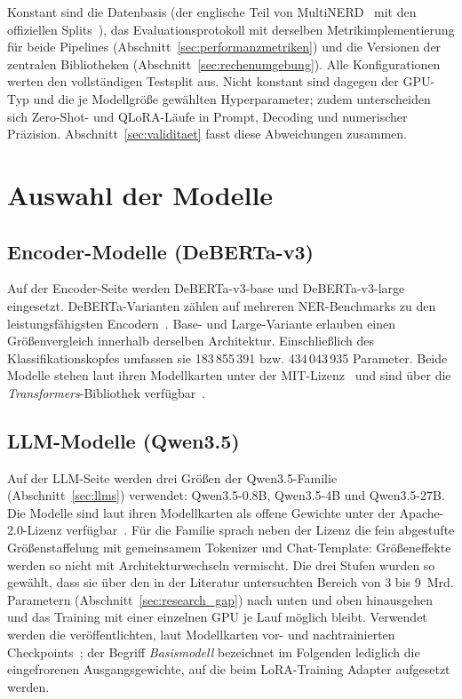 Konstant sind die Datenbasis (der englische Teil von
MultiNERD~\cite{tedeschi2022multinerd} mit den offiziellen
Splits~\cite{babelscape2023multinerdcard}), das
Evaluationsprotokoll mit derselben Metrikimplementierung für beide
Pipelines (Abschnitt~\ref{sec:performanzmetriken}) und die Versionen der
zentralen Bibliotheken (Abschnitt~\ref{sec:rechenumgebung}).
Alle Konfigurationen werten den vollständigen Testsplit aus.
Nicht konstant sind dagegen der GPU-Typ und die je Modellgröße gewählten
Hyperparameter; zudem unterscheiden sich Zero-Shot- und QLoRA-Läufe in
Prompt, Decoding und numerischer Präzision.
Abschnitt~\ref{sec:validitaet} fasst diese Abweichungen zusammen.

\section{Auswahl der Modelle}
\label{sec:modellauswahl}

\subsection{Encoder-Modelle (DeBERTa-v3)}
\label{sec:encoder-auswahl}

Auf der Encoder-Seite werden DeBERTa-v3-base und DeBERTa-v3-large
eingesetzt.
DeBERTa-Varianten zählen auf mehreren NER-Benchmarks zu den
leistungsfähigsten Encodern~\cite{keraghel2024recent}.
Base- und Large-Variante erlauben einen Größenvergleich innerhalb
derselben Architektur. Einschließlich des Klassifikationskopfes umfassen
sie 183\,855\,391 bzw. 434\,043\,935 Parameter.
Beide Modelle stehen laut ihren Modellkarten unter der MIT-Lizenz~\cite{he2021debertav3card,he2021debertav3cardlarge} und sind über die
\emph{Transformers}-Bibliothek verfügbar~\cite{wolf2020transformers}.

\subsection{LLM-Modelle (Qwen3.5)}
\label{sec:llm-auswahl}

Auf der LLM-Seite werden drei Größen der Qwen3.5-Familie
(Abschnitt~\ref{sec:llms}) verwendet:
Qwen3.5-0.8B, Qwen3.5-4B und Qwen3.5-27B.
Die
Modelle sind laut ihren Modellkarten als offene Gewichte unter der
Apache-2.0-Lizenz verfügbar~\cite{qwen2026card08b,qwen2026card4b,qwen2026card27b}.
Für die Familie sprach neben der Lizenz die fein abgestufte Größenstaffelung mit
gemeinsamem Tokenizer und Chat-Template: Größeneffekte werden so nicht mit
Architekturwechseln vermischt.
Die drei Stufen wurden so gewählt, dass sie über den in der Literatur
untersuchten Bereich von 3 bis 9~Mrd. Parametern
(Abschnitt~\ref{sec:research_gap}) nach unten und oben hinausgehen und das
Training mit einer einzelnen GPU je Lauf möglich bleibt.
Verwendet werden die veröffentlichten, laut Modellkarten vor- und
nachtrainierten Checkpoints~\cite{qwen2026card08b,qwen2026card4b,qwen2026card27b}; der Begriff
\emph{Basismodell} bezeichnet im Folgenden lediglich die eingefrorenen
Ausgangsgewichte, auf die beim LoRA-Training Adapter aufgesetzt werden.

